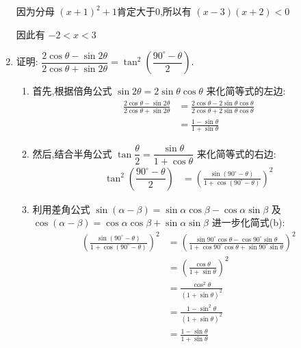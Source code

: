 \documentclass[answers]{exam}
\begin{document}
\begin{questions}
\begin{enumerate}[label=(\arabic*)]
\begin{solution}
			      因为分母 \( (x+1)^2 + 1  \)肯定大于0,所以有 \( (x-3)(x+2) < 0 \)

			      因此有 \( -2 < x < 3 \)
		      \end{solution}

		\item 证明: \( \dfrac{2\cos\theta - \sin2\theta}{2\cos\theta + \sin2\theta} = \tan^2\left(\dfrac{90^\circ -
			      \theta}{2}\right) \).
		      \begin{solution}
			      \begin{enumerate}[label=\arabic*. ]
				      \item 首先,根据倍角公式 \( \sin2\theta = 2\sin\theta\cos\theta \) 来化简等式的左边:
				            \begin{align*}
					            \frac{2\cos\theta - \sin2\theta}{2\cos\theta + \sin2\theta}
					             & = \frac{2\cos\theta - 2\sin\theta\cos\theta}{2\cos\theta + 2\sin\theta\cos\theta} \\
					             & = \frac{1-\sin\theta}{1+\sin\theta} \tag{a}
				            \end{align*}
				      \item 然后,结合半角公式 \( \tan\dfrac{\theta}{2} = \dfrac{\sin\theta}{1+\cos\theta} \)
				            来化简等式的右边:
				            \begin{align*}
					            \tan^2\left(\dfrac{90^\circ - \theta}{2}\right)
					             & = \left(\frac{\sin(90^\circ-\theta)}{1+\cos(90^\circ-\theta)}\right)^2 \tag{b}
				            \end{align*}
				      \item 利用差角公式 \( \sin(\alpha-\beta) = \sin\alpha\cos\beta - \cos\alpha\sin\beta \) 及 \(
				            \cos(\alpha - \beta) = \cos\alpha\cos\beta + \sin\alpha\sin\beta \) 进一步化简式(b):
				            \begin{align*}
					            \left(\frac{\sin(90^\circ-\theta)}{1+\cos(90^\circ-\theta)}\right)^2
					             & = \left(\frac{\sin90^\circ\cos\theta -
						            \cos90^\circ\sin\theta}{1+\cos90^\circ\cos\theta + \sin90^\circ\sin\theta}\right)^2
					            \\
					             & = \left(\frac{\cos\theta}{1+\sin\theta}\right)^2 \\
					             & = \frac{\cos^2\theta}{(1+\sin\theta)^2}          \\
					             & = \frac{1-\sin^2\theta}{(1+\sin\theta)^2}        \\
					             & = \frac{1-\sin\theta}{1+\sin\theta} \tag{c}

\end{align*}
\end{enumerate}
\end{solution}
\end{enumerate}
\end{questions}
\end{document}
